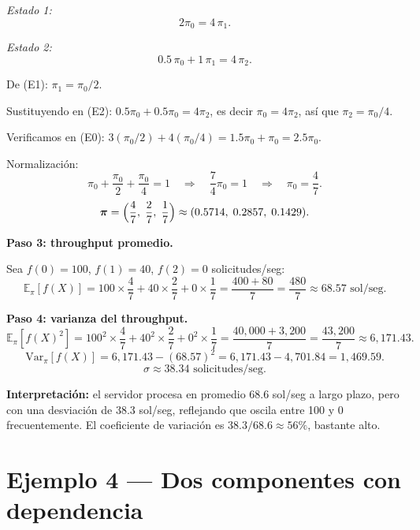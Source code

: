\documentclass[11pt,a4paper]{article}
\theoremstyle{definition}
\theoremstyle{remark}
\newcommand{\E}{\mathbb{E}}
\newcommand{\Var}{\mathrm{Var}}
\begin{document}
\begin{ejemplo}
\emph{Estado 1:}
\[
  2\pi_0 = 4\,\pi_1. \tag{E1}
\]

\emph{Estado 2:}
\[
  0.5\,\pi_0 + 1\,\pi_1 = 4\,\pi_2. \tag{E2}
\]

De (E1): $\pi_1 = \pi_0/2$.

Sustituyendo en (E2): $0.5\pi_0 + 0.5\pi_0 = 4\pi_2$, es decir
$\pi_0 = 4\pi_2$, así que $\pi_2 = \pi_0/4$.

Verificamos en (E0): $3(\pi_0/2)+4(\pi_0/4) = 1.5\pi_0+\pi_0 = 2.5\pi_0$. \checkmark

Normalización:
\[
  \pi_0 + \frac{\pi_0}{2} + \frac{\pi_0}{4} = 1
  \quad\Longrightarrow\quad
  \frac{7}{4}\pi_0 = 1
  \quad\Longrightarrow\quad
  \pi_0 = \frac{4}{7}.
\]
\[
  \boldsymbol{\pi} = \Bigl(\frac{4}{7},\;\frac{2}{7},\;\frac{1}{7}\Bigr)
  \approx (0.5714,\;0.2857,\;0.1429).
\]

\textbf{Paso 3: throughput promedio.}

Sea $f(0)=100$, $f(1)=40$, $f(2)=0$ solicitudes/seg:
\[
  \E_\pi[f(X)] = 100\times\frac{4}{7} + 40\times\frac{2}{7}
  + 0\times\frac{1}{7}
  = \frac{400+80}{7} = \frac{480}{7} \approx 68.57 \text{ sol/seg}.
\]

\textbf{Paso 4: varianza del throughput.}
\[
  \E_\pi[f(X)^2] = 100^2\times\frac{4}{7} + 40^2\times\frac{2}{7}
  + 0^2\times\frac{1}{7}
  = \frac{40{,}000+3{,}200}{7} = \frac{43{,}200}{7} \approx 6{,}171.43.
\]
\[
  \Var_\pi[f(X)] = 6{,}171.43 - (68.57)^2 = 6{,}171.43 - 4{,}701.84
  = 1{,}469.59.
\]
\[
  \sigma \approx 38.34 \text{ solicitudes/seg}.
\]

\textbf{Interpretación:} el servidor procesa en promedio 68.6 sol/seg
a largo plazo, pero con una desviación de 38.3 sol/seg, reflejando que
oscila entre 100 y 0 frecuentemente.  El coeficiente de variación es
$38.3/68.6 \approx 56\%$, bastante alto.
\end{ejemplo}

\section{Ejemplo 4 --- Dos componentes con dependencia}
\end{document}
